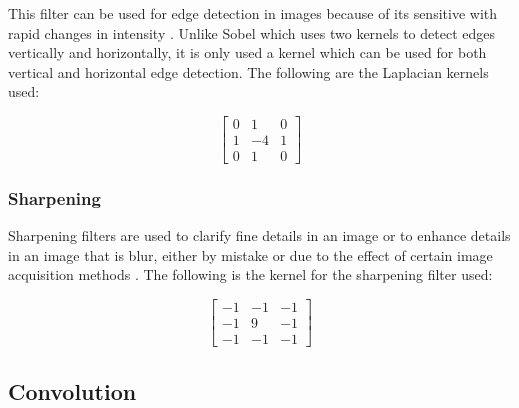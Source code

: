 This filter can be used for edge detection in images because of its sensitive with rapid changes in intensity \cite{pdf:jingbo}. Unlike Sobel which uses two kernels to detect edges vertically and horizontally, it is only used a kernel which can be used for both vertical and horizontal edge detection. The following are the Laplacian kernels used:

\begin{equation}
    \label{kernel:laplacian}
    \left[
    \begin{matrix}
 0 & 1 & 0 \\
 1 & -4 & 1 \\
 0 & 1 & 0
    \end{matrix}
    \right]
\end{equation}

\subsubsection{Sharpening}

Sharpening filters are used to clarify fine details in an image or to enhance details in an image that is blur, either by mistake or due to the effect of certain image acquisition methods \cite{pdf:ching}. The following is the kernel for the sharpening filter used:

\begin{equation}
    \label{kernel:sharpen}
    \left[
    \begin{matrix}
 -1 & -1 & -1 \\
 -1 & 9 & -1 \\
 -1 & -1 & -1
    \end{matrix}
    \right]
\end{equation}


\subsection{Convolution}


